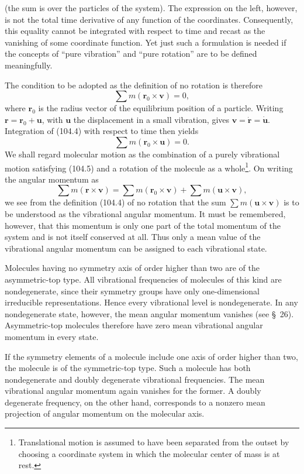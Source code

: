(the sum is over the particles of the system). The expression on the left, however, is not the total time derivative of any function of the coordinates. Consequently, this equality cannot be integrated with respect to time and recast as the vanishing of some coordinate function. Yet just such a formulation is needed if the concepts of ``pure vibration'' and ``pure rotation'' are to be defined meaningfully.

The condition to be adopted as the definition of no rotation is therefore
\begin{equation}
 \sum m(\mathbf r_0\times\mathbf v)=0,
 \tag{104.4}
\end{equation}
where $\mathbf r_0$ is the radius vector of the equilibrium position of a particle. Writing $\mathbf r=\mathbf r_0+\mathbf u$, with $\mathbf u$ the displacement in a small vibration, gives $\mathbf v=\dot{\mathbf r}=\dot{\mathbf u}$. Integration of (104.4) with respect to time then yields
\begin{equation}
 \sum m(\mathbf r_0\times\mathbf u)=0.
 \tag{104.5}
\end{equation}
We shall regard molecular motion as the combination of a purely vibrational motion satisfying (104.5) and a rotation of the molecule as a whole\footnote{Translational motion is assumed to have been separated from the outset by choosing a coordinate system in which the molecular center of mass is at rest.}. On writing the angular momentum as
\[
 \sum m(\mathbf r\times\mathbf v)=\sum m(\mathbf r_0\times\mathbf v)+\sum m(\mathbf u\times\mathbf v),
\]
we see from the definition (104.4) of no rotation that the sum $\sum m(\mathbf u\times\mathbf v)$ is to be understood as the vibrational angular momentum. It must be remembered, however, that this momentum is only one part of the total momentum of the system and is not itself conserved at all. Thus only a mean value of the vibrational angular momentum can be assigned to each vibrational state.

Molecules having no symmetry axis of order higher than two are of the asymmetric-top type. All vibrational frequencies of molecules of this kind are nondegenerate, since their symmetry groups have only one-dimensional irreducible representations. Hence every vibrational level is nondegenerate. In any nondegenerate state, however, the mean angular momentum vanishes (see §~26). Asymmetric-top molecules therefore have zero mean vibrational angular momentum in every state.

If the symmetry elements of a molecule include one axis of order higher than two, the molecule is of the symmetric-top type. Such a molecule has both nondegenerate and doubly degenerate vibrational frequencies. The mean vibrational angular momentum again vanishes for the former. A doubly degenerate frequency, on the other hand, corresponds to a nonzero mean projection of angular momentum on the molecular axis.


